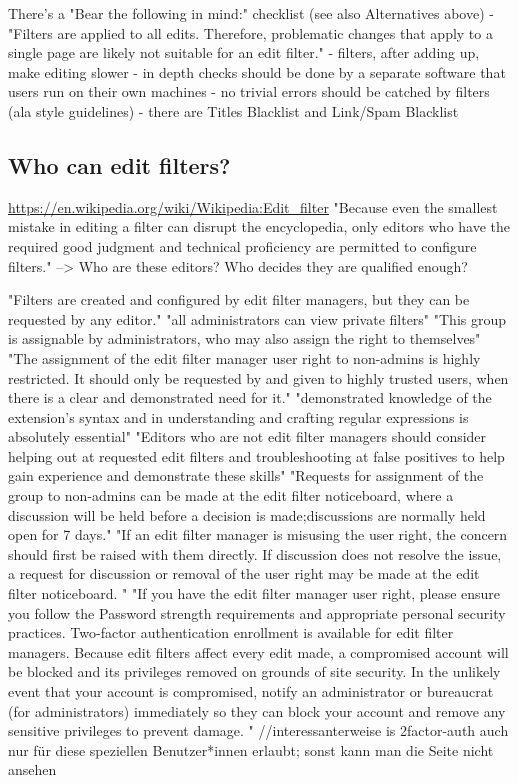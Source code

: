 \documentclass{sigchi}
\begin{document}
There's a "Bear the following in mind:" checklist (see also Alternatives above)
- "Filters are applied to all edits. Therefore, problematic changes that apply to a single page are likely not suitable for an edit filter."
- filters, after adding up, make editing slower
- in depth checks should be done by a separate software that users run on their own machines
- no trivial errors should be catched by filters (ala style guidelines)
- there are Titles Blacklist and Link/Spam Blacklist

\subsection{Who can edit filters?}

\url{https://en.wikipedia.org/wiki/Wikipedia:Edit_filter}
"Because even the smallest mistake in editing a filter can disrupt the encyclopedia, only editors who have the required good judgment and technical proficiency are permitted to configure filters."
--> Who are these editors? Who decides they are qualified enough?

"Filters are created and configured by edit filter managers, but they can be requested by any editor."
"all administrators can view private filters"
"This group is assignable by administrators, who may also assign the right to themselves"
"The assignment of the edit filter manager user right to non-admins is highly restricted. It should only be requested by and given to highly trusted users, when there is a clear and demonstrated need for it."
"demonstrated knowledge of the extension's syntax and in understanding and crafting regular expressions is absolutely essential"
"Editors who are not edit filter managers should consider helping out at requested edit filters and troubleshooting at false positives to help gain experience and demonstrate these skills"
"Requests for assignment of the group to non-admins can be made at the edit filter noticeboard, where a discussion will be held before a decision is made;discussions are normally held open for 7 days."
"If an edit filter manager is misusing the user right, the concern should first be raised with them directly. If discussion does not resolve the issue, a request for discussion or removal of the user right may be made at the edit filter noticeboard. "
"If you have the edit filter manager user right, please ensure you follow the Password strength requirements and appropriate personal security practices. Two-factor authentication enrollment is available for edit filter managers. Because edit filters affect every edit made, a compromised account will be blocked and its privileges removed on grounds of site security. In the unlikely event that your account is compromised, notify an administrator or bureaucrat (for administrators) immediately so they can block your account and remove any sensitive privileges to prevent damage. "
//interessanterweise is 2factor-auth auch nur für diese speziellen Benutzer*innen erlaubt; sonst kann man die Seite nicht ansehen
\end{document}
